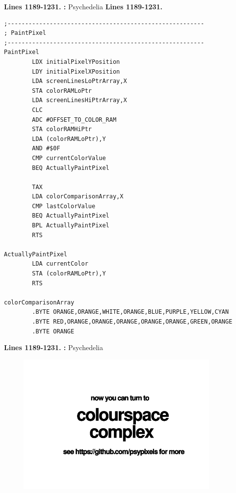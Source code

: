 \textbf{Lines 1189-1231. :} Psychedelia
\clearpage
\textbf{Lines 1189-1231. } 
\begin{lstlisting}[caption = All the pattern data structures in Psychedelia organized into a set of arrays.]
;--------------------------------------------------------
; PaintPixel
;--------------------------------------------------------
PaintPixel   
        LDX initialPixelYPosition
        LDY initialPixelXPosition
        LDA screenLinesLoPtrArray,X
        STA colorRAMLoPtr
        LDA screenLinesHiPtrArray,X
        CLC 
        ADC #OFFSET_TO_COLOR_RAM
        STA colorRAMHiPtr
        LDA (colorRAMLoPtr),Y
        AND #$0F
        CMP currentColorValue
        BEQ ActuallyPaintPixel

        TAX 
        LDA colorComparisonArray,X
        CMP lastColorValue
        BEQ ActuallyPaintPixel
        BPL ActuallyPaintPixel
        RTS 

ActuallyPaintPixel   
        LDA currentColor
        STA (colorRAMLoPtr),Y
        RTS 

colorComparisonArray   
        .BYTE ORANGE,ORANGE,WHITE,ORANGE,BLUE,PURPLE,YELLOW,CYAN
        .BYTE RED,ORANGE,ORANGE,ORANGE,ORANGE,ORANGE,GREEN,ORANGE
        .BYTE ORANGE

\end{lstlisting}
\clearpage

\textbf{Lines 1189-1231. :} Psychedelia
\clearpage

\vspace*{\fill}
\begin{figure}[H]
    \centering
      \includegraphics[width=10cm]{src/cover/title_page_colorspace_coming_soon.png}%
\end{figure}

\vspace*{\fill}
